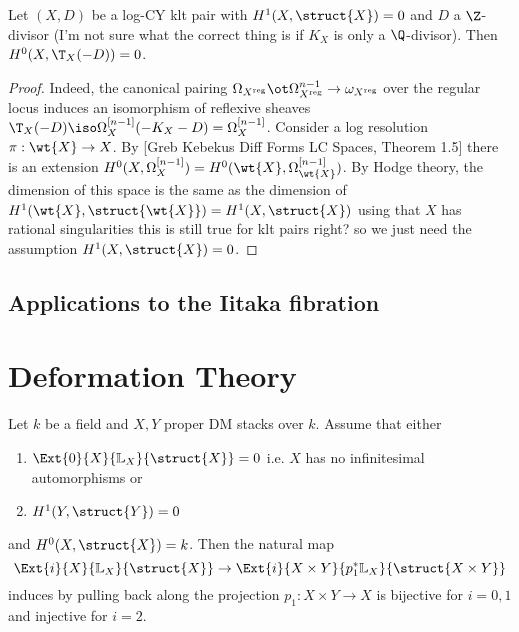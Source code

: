 \documentclass[12pt]{article}
\newcommand{\LL}{\mathbb{L}}
\begin{document}
\begin{lemma}
Let $(X, D)$ be a log-CY klt pair with $H^1(X, \struct{X}) = 0$ and $D$ a $\Z$-divisor (I'm not sure what the correct thing is if $K_X$ is only a $\Q$-divisor). Then $H^0(X, \T_X(-D)) = 0$.
\end{lemma}

\newcommand{\reg}{\mathrm{reg}}

\begin{proof}
Indeed, the canonical pairing $\Omega_{X^{\reg}} \ot \Omega_{X^{\reg}}^{n-1} \to \omega_{X^{\reg}}$ over the regular locus induces an isomorphism of reflexive sheaves $\T_X(-D) \iso \Omega_X^{[n-1]}(-K_X - D) = \Omega_X^{[n-1]}$. Consider a log resolution $\pi : \wt{X} \to X$. By [Greb Kebekus Diff Forms LC Spaces, Theorem 1.5] there is an extension $H^0(X, \Omega_X^{[n-1]}) = H^0(\wt{X}, \Omega_{\wt{X}}^{[n-1]})$. By Hodge theory, the dimension of this space is the same as the dimension of $H^1(\wt{X}, \struct{\wt{X}}) = H^1(X, \struct{X})$ using that $X$ has rational singularities {\color{red} this is still true for klt pairs right?} so we just need the assumption $H^1(X, \struct{X}) = 0$.
\end{proof}

\subsection{Applications to the Iitaka fibration}

\section{Deformation Theory}

\begin{lemma}
Let $k$ be a field and $X,Y$ proper DM stacks over $k$. Assume that either
\begin{enumerate}
\item $\Ext{0}{X}{\LL_X}{\struct{X}} = 0$ i.e. $X$ has no infinitesimal automorphisms or
\item $H^1(Y, \struct{Y}) = 0$ 
\end{enumerate}
and $H^0(X, \struct{X}) = k$. Then the natural map
\[ \Ext{i}{X}{\LL_X}{\struct{X}} \to \Ext{i}{X \times Y}{p_1^* \LL_X}{\struct{X \times Y}} \]
induces by pulling back along the projection $p_1 : X \times Y \to X$ is bijective for $i = 0,1$ and injective for $i = 2$.
\end{lemma}

\newcommand{\cQ}{\mathcal{Q}}
\end{document}
